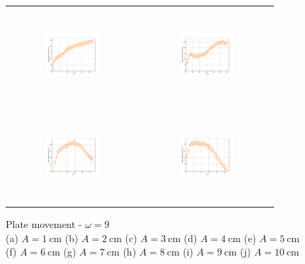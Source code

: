 \begin{figure}[H]
\begin{center}
\begin{tabular}{cc}
\includegraphics[width=0.45\textwidth, height=3.5cm]{graph/omega=2.50_A=7_plate.pdf}
&
\includegraphics[width=0.45\textwidth, height=3.5cm]{graph/omega=2.50_A=8_plate.pdf}\\
\includegraphics[width=0.45\textwidth, height=3.5cm]{graph/omega=2.50_A=9_plate.pdf}
&
\includegraphics[width=0.45\textwidth, height=3.5cm]{graph/omega=2.50_A=10_plate.pdf}\\
\end{tabular}
\end{center}
\caption{Plate movement - $\omega=9$ \\ (a) $A=1\mathrm{~cm}$ (b) $A=2\mathrm{~cm}$ (c) $A=3\mathrm{~cm}$ (d) $A=4\mathrm{~cm}$ (e) $A=5\mathrm{~cm}$\\(f) $A=6\mathrm{~cm}$ (g) $A=7\mathrm{~cm}$ (h) $A=8\mathrm{~cm}$ (i) $A=9\mathrm{~cm}$ (j) $A=10\mathrm{~cm}$}
\label{Data_omega=9_plate}
\end{figure}

